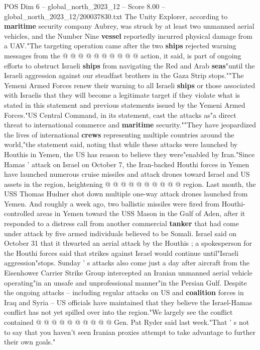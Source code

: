 \begin{textsample}{POS Dim 6 – global\_north\_2023\_12 – Score 8.00 – global\_north\_2023\_12/200037830.txt}
The Unity Explorer, according to \textbf{maritime} security company Aubrey, was struck by at least two unmanned aerial vehicles, and the Number Nine \textbf{vessel} reportedly incurred physical damage from a UAV."The targeting operation came after the two \textbf{ships} rejected warning messages from the @ @ @ @ @ @ @ @ @ @ action, it said, is part of ongoing efforts to obstruct Israeli \textbf{ships} from navigating the Red and Arab \textbf{seas}"until the Israeli aggression against our steadfast brothers in the Gaza Strip stops.""The Yemeni Armed Forces renew their warning to all Israeli \textbf{ships} or those associated with Israelis that they will become a legitimate target if they violate what is stated in this statement and previous statements issued by the Yemeni Armed Forces."US Central Command, in its statement, cast the attacks as"a direct threat to international commerce and \textbf{maritime} security.""They have jeopardized the lives of international \textbf{crews} representing multiple countries around the world,"the statement said, noting that while these attacks were launched by Houthis in Yemen, the US has reason to believe they were"enabled by Iran."Since Hamas ' attack on Israel on October 7, the Iran-backed Houthi forces in Yemen have launched numerous cruise missiles and attack drones toward Israel and US assets in the region, heightening @ @ @ @ @ @ @ @ @ @ region.
Last month, the USS Thomas Hudner shot down multiple one-way attack drones launched from Yemen.
And roughly a week ago, two ballistic missiles were fired from Houthi-controlled areas in Yemen toward the USS Mason in the Gulf of Aden, after it responded to a distress call from another commercial \textbf{tanker} that had come under attack by five armed individuals believed to be Somali.
Israel said on October 31 that it thwarted an aerial attack by the Houthis ; a spokesperson for the Houthi forces said that strikes against Israel would continue until"Israeli aggression"stops.
Sunday ' s attacks also come just a day after aircraft from the Eisenhower Carrier Strike Group intercepted an Iranian unmanned aerial vehicle operating"in an unsafe and unprofessional manner"in the Persian Gulf.
Despite the ongoing attacks -- including regular attacks on US and \textbf{coalition} forces in Iraq and Syria -- US officials have maintained that they believe the Israel-Hamas conflict has not yet spilled over into the region."We largely see the conflict contained @ @ @ @ @ @ @ @ @ @ Gen.
Pat Ryder said last week."That ' s not to say that you haven't seen Iranian proxies attempt to take advantage to further their own goals."

\end{textsample}
